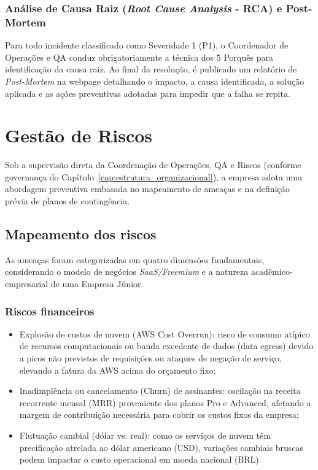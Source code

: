 \documentclass[
  12pt,
  openright,
  oneside,
  a4paper,
  brazilian
]{abntex2}
\begin{document}
\subsection{Análise de Causa Raiz (\textit{Root Cause Analysis} - RCA) e Post-Mortem}
Para todo incidente classificado como Severidade 1 (P1), o Coordenador de Operações e QA conduz obrigatoriamente a técnica dos 5 Porquês para identificação da causa raiz. Ao final da resolução, é publicado um relatório de \textit{Post-Mortem} na webpage detalhando o impacto, a causa identificada, a solução aplicada e as ações preventivas adotadas para impedir que a falha se repita.

\chapter{Gestão de Riscos}
\label{cap:gestao_riscos}

Sob a supervisão direta da Coordenação de Operações, QA e Riscos (conforme governança do Capítulo~\ref{cap:estrutura_organizacional}), a empresa adota uma abordagem preventiva embasada no mapeamento de ameaças e na definição prévia de planos de contingência.

\section{Mapeamento dos riscos}
\label{sec:mapeamento_riscos}

As ameaças foram categorizadas em quatro dimensões fundamentais, considerando o modelo de negócios \textit{SaaS/Freemium} e a natureza acadêmico-empresarial de uma Empresa Júnior.

\subsection{Riscos financeiros}
\label{subsec:riscos_financeiros}
\begin{itemize}
    \item{Explosão de custos de nuvem (AWS Cost Overrun):} risco de consumo atípico de recursos computacionais ou banda excedente de dados (data egress) devido a picos não previstos de requisições ou ataques de negação de serviço, elevando a fatura da AWS acima do orçamento fixo;
    \item{Inadimplência ou cancelamento (Churn) de assinantes:} oscilação na receita recorrente mensal (MRR) proveniente dos planos Pro e Advanced, afetando a margem de contribuição necessária para cobrir os custos fixos da empresa;
    \item{Flutuação cambial (dólar vs. real):} como os serviços de nuvem têm precificação atrelada ao dólar americano (USD), variações cambiais bruscas podem impactar o custo operacional em moeda nacional (BRL).
\end{itemize}
\end{document}
